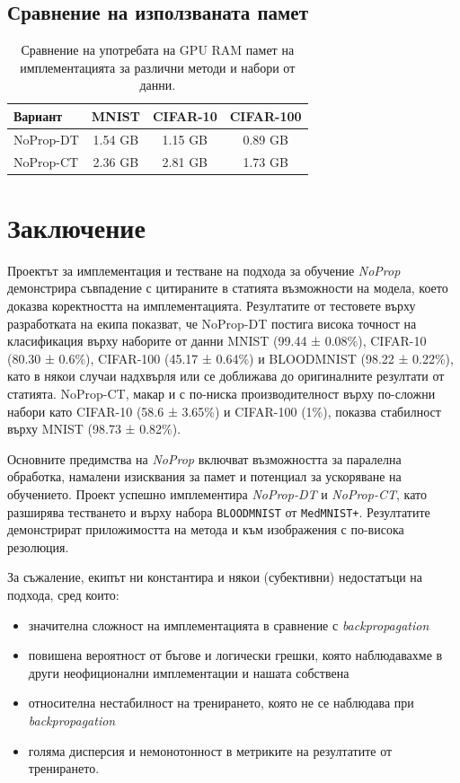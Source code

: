 \documentclass[a4paper,11pt]{article}
\begin{document}
\subsection{Сравнение на използваната памет}
\begin{table}[H]
    \centering
    \begin{tabular}{lccc}
    \toprule
    \textbf{Вариант} & \textbf{MNIST} & \textbf{CIFAR-10} & \textbf{CIFAR-100} \\
    \midrule
    NoProp-DT & 1.54 GB & 1.15 GB & 0.89 GB \\
    \midrule
    NoProp-CT & 2.36 GB & 2.81 GB & 1.73 GB \\
    \bottomrule
    \end{tabular}
    \caption{Сравнение на употребата на GPU RAM памет на имплементацията за различни методи и набори от данни.}
    \label{table:memory_usage}
\end{table}

\newpage
\section{Заключение}

Проектът за имплементация и тестване на подхода за обучение \emph{NoProp} демонстрира съвпадение с цитираните в статията възможности на модела, което доказва коректността на имплементацията. Резултатите от тестовете върху разработката на екипа показват, че NoProp-DT постига висока точност на класификация върху наборите от данни MNIST (99.44 ± 0.08\%), CIFAR-10 (80.30 ± 0.6\%), CIFAR-100 (45.17 ± 0.64\%) и BLOODMNIST (98.22 ± 0.22\%), като в някои случаи надхвърля или се доближава до оригиналните резултати от статията. NoProp-CT, макар и с по-ниска производителност върху по-сложни набори като CIFAR-10 (58.6 ± 3.65\%) и CIFAR-100 (1\%), показва стабилност върху MNIST (98.73 ± 0.82\%).

Основните предимства на \emph{NoProp} включват възможността за паралелна обработка, намалени изисквания за памет и потенциал за ускоряване на обучението. Проект успешно имплементира \emph{NoProp-DT} и \emph{NoProp-CT}, като разширява тестването и върху набора \texttt{BLOODMNIST} от \texttt{MedMNIST+}. Резултатите демонстрират приложимостта на метода и към изображения с по-висока резолюция. 

За съжаление, екипът ни константира и някои (субективни) недостатъци на подхода, сред които:
\begin{itemize}
    \item значителна сложност на имплементацията в сравнение с \emph{backpropagation}
    \item повишена вероятност от бъгове и логически грешки, която наблюдавахме в други неофиционални имплементации\cite{githubPotentiallyIncorrect} и нашата собствена
    \item относителна нестабилност на тренирането, която не се наблюдава при \emph{backpropagation}
    \item голяма дисперсия и немонотонност в метриките на резултатите от тренирането. 
\end{itemize}
\end{document}
